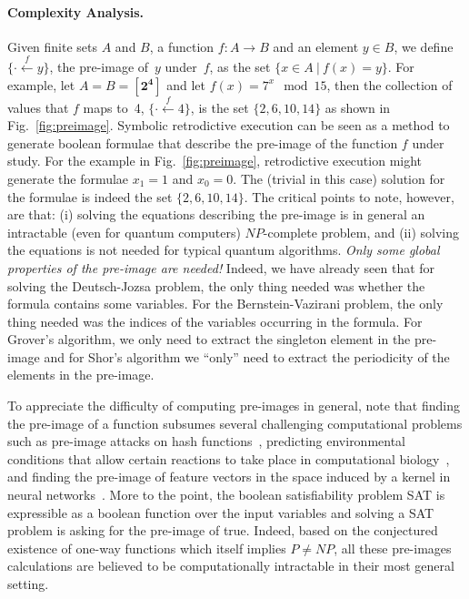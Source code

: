 \documentclass{article}
\newcommand{\preim}[2]{\{\cdot\stackrel{#1}{\longleftarrow}{#2}\}}
\newcommand{\finset}[1]{[\mathbf{#1}]}
\begin{document}
\begin{refsection}
\paragraph*{Complexity Analysis.}
Given finite sets $A$ and $B$, a function $f : A \rightarrow B$ and an
element $y \in B$, we define $\preim{f}{y}$, the pre-image of~$y$
under~$f$, as the set $\{ x \in A ~|~ f(x) = y \}$. For example, let
$A = B = \finset{2^4}$ and let $f(x) = 7^x \mod 15$, then the
collection of values that $f$ maps to~4, $\preim{f}{4}$, is the set
$\{ 2, 6, 10, 14 \}$ as shown in Fig.~\ref{fig:preimage}. Symbolic
retrodictive execution can be seen as a method to generate boolean
formulae that describe the pre-image of the function $f$ under
study. For the example in Fig.~\ref{fig:preimage}, retrodictive
execution might generate the formulae $x_1=1$ and $x_0=0$. The
(trivial in this case) solution for the formulae is indeed the set $\{
2, 6, 10, 14 \}$. The critical points to note, however, are that: (i)
solving the equations describing the pre-image is in general an
intractable (even for quantum computers) $\mathit{NP}$-complete
problem, and (ii) solving the equations is not needed for typical
quantum algorithms. \emph{Only some global properties of the pre-image
  are needed!} Indeed, we have already seen that for solving the
Deutsch-Jozsa problem, the only thing needed was whether the formula
contains some variables. For the Bernstein-Vazirani problem, the only
thing needed was the indices of the variables occurring in the
formula. For Grover's algorithm, we only need to extract the singleton
element in the pre-image and for Shor's algorithm we ``only'' need to
extract the periodicity of the elements in the pre-image.

To appreciate the difficulty of computing pre-images in general, note
that finding the pre-image of a function subsumes several challenging
computational problems such as pre-image attacks on hash
functions~\cite{10.1007/978-3-540-25937-4_24}, predicting
environmental conditions that allow certain reactions to take place in
computational biology~\cite{Klotz2013,akutsu2009analyses}, and finding
the pre-image of feature vectors in the space induced by a kernel in
neural networks~\cite{1353287}. More to the point, the boolean
satisfiability problem SAT is expressible as a boolean function over
the input variables and solving a SAT problem is asking for the
pre-image of \textsf{true}. Indeed, based on the conjectured existence
of one-way functions which itself implies $\mathit{P} \neq
\mathit{NP}$, all these pre-images calculations are believed to be
computationally intractable in their most general setting.


\end{refsection}
\end{document}
